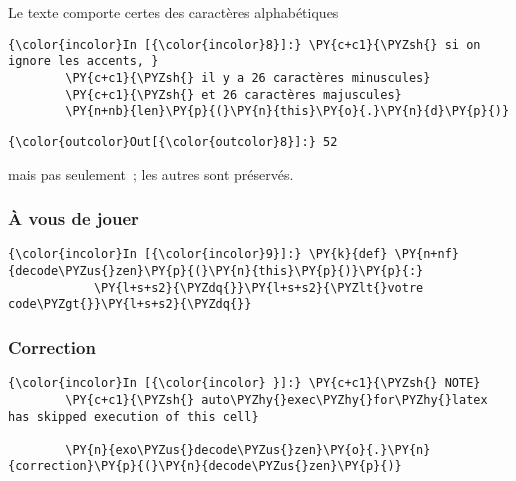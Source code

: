     Le texte comporte certes des caractères alphabétiques

    \begin{Verbatim}[commandchars=\\\{\}]
{\color{incolor}In [{\color{incolor}8}]:} \PY{c+c1}{\PYZsh{} si on ignore les accents, }
        \PY{c+c1}{\PYZsh{} il y a 26 caractères minuscules}
        \PY{c+c1}{\PYZsh{} et 26 caractères majuscules}
        \PY{n+nb}{len}\PY{p}{(}\PY{n}{this}\PY{o}{.}\PY{n}{d}\PY{p}{)}
\end{Verbatim}


\begin{Verbatim}[commandchars=\\\{\}]
{\color{outcolor}Out[{\color{outcolor}8}]:} 52
\end{Verbatim}
            
    mais pas seulement~; les autres sont préservés.

    \hypertarget{uxe0-vous-de-jouer}{%
\subsubsection{À vous de jouer}\label{uxe0-vous-de-jouer}}

    \begin{Verbatim}[commandchars=\\\{\}]
{\color{incolor}In [{\color{incolor}9}]:} \PY{k}{def} \PY{n+nf}{decode\PYZus{}zen}\PY{p}{(}\PY{n}{this}\PY{p}{)}\PY{p}{:}
            \PY{l+s+s2}{\PYZdq{}}\PY{l+s+s2}{\PYZlt{}votre code\PYZgt{}}\PY{l+s+s2}{\PYZdq{}}
\end{Verbatim}


    \hypertarget{correction}{%
\subsubsection{Correction}\label{correction}}

    \begin{Verbatim}[commandchars=\\\{\}]
{\color{incolor}In [{\color{incolor} }]:} \PY{c+c1}{\PYZsh{} NOTE}
        \PY{c+c1}{\PYZsh{} auto\PYZhy{}exec\PYZhy{}for\PYZhy{}latex has skipped execution of this cell}
        
        \PY{n}{exo\PYZus{}decode\PYZus{}zen}\PY{o}{.}\PY{n}{correction}\PY{p}{(}\PY{n}{decode\PYZus{}zen}\PY{p}{)}
\end{Verbatim}



    
    
    
